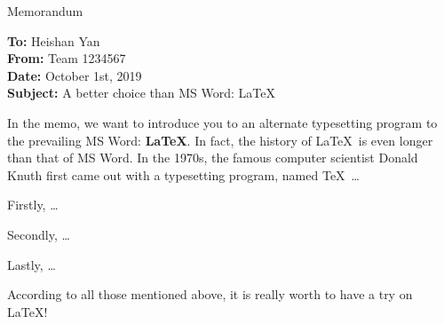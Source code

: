 \documentclass[12pt]{ctexart}
\begin{document}
\begin{letter}{Memorandum}
	\begin{flushleft}  %
		\textbf{To:} Heishan Yan\\
		\textbf{From:} Team 1234567\\
		\textbf{Date:} October 1st, 2019\\
		\textbf{Subject:} A better choice than MS Word: \LaTeX
	\end{flushleft}

	In the memo, we want to introduce you to an alternate typesetting program to the prevailing MS Word: \textbf{\LaTeX}. In fact, the history of \LaTeX\ is even longer than that of MS Word. In the 1970s, the famous computer scientist Donald Knuth first came out with a typesetting program,  named \TeX\ \ldots

	Firstly, \ldots

	Secondly, \ldots

	Lastly, \ldots

	According to all those mentioned above, it is really worth to have a try on \LaTeX!
\end{letter}





\begin{center}
\end{center}
\end{document}
